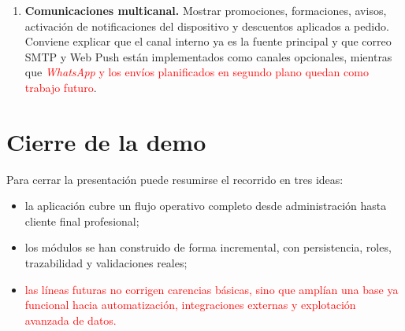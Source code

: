 \begin{enumerate}
    \item \textbf{Comunicaciones multicanal.} Mostrar promociones, formaciones, avisos, activación de notificaciones del dispositivo y descuentos aplicados a pedido. Conviene explicar que el canal interno ya es la fuente principal y que correo SMTP y Web Push están implementados como canales opcionales, mientras que \textcolor{red}{\textit{WhatsApp} y los envíos planificados en segundo plano quedan como trabajo futuro}.
\end{enumerate}

\section{Cierre de la demo}

Para cerrar la presentación puede resumirse el recorrido en tres ideas:

\begin{itemize}
    \item la aplicación cubre un flujo operativo completo desde administración hasta cliente final profesional;
    \item los módulos se han construido de forma incremental, con persistencia, roles, trazabilidad y validaciones reales;
    \item \textcolor{red}{las líneas futuras no corrigen carencias básicas, sino que amplían una base ya funcional hacia automatización, integraciones externas y explotación avanzada de datos.}
\end{itemize}
